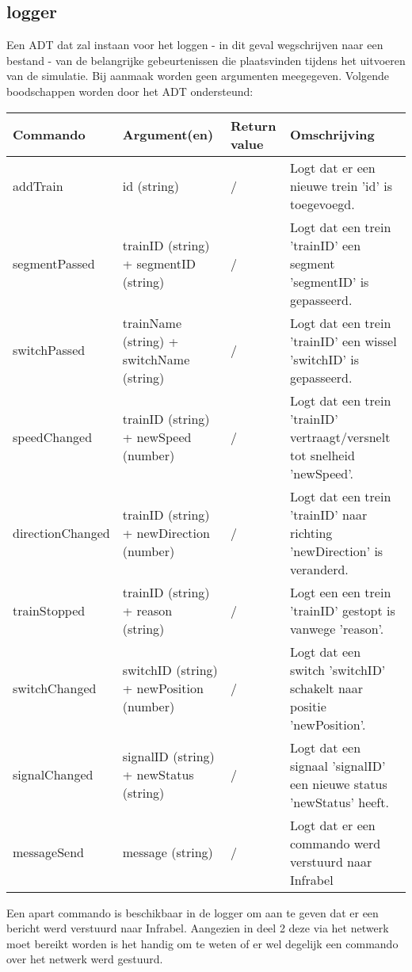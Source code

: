 \documentclass{article}
\begin{document}
\subsection{logger} %
Een ADT dat zal instaan voor het loggen - in dit geval wegschrijven naar een bestand - van de belangrijke gebeurtenissen die plaatsvinden tijdens het uitvoeren van de simulatie. Bij aanmaak worden geen argumenten meegegeven.
Volgende boodschappen worden door het ADT ondersteund:
\begin{center}
    \begin{tabular}{ | l | p{3.5cm} | l | p{8cm} |}
    \hline
    Commando & Argument(en) & Return value & Omschrijving \\ \hline
    addTrain & id (string) & / & Logt dat er een nieuwe trein 'id' is toegevoegd. \\ \hline
    segmentPassed & trainID (string) + segmentID (string) & / & Logt dat een trein 'trainID' een segment 'segmentID' is gepasseerd. \\ \hline
    switchPassed & trainName (string) + switchName (string) & / & Logt dat een trein 'trainID' een wissel 'switchID' is gepasseerd. \\ \hline
    speedChanged & trainID (string) + newSpeed (number) & / & Logt dat een trein 'trainID' vertraagt/versnelt tot snelheid 'newSpeed'. \\ \hline
    directionChanged & trainID (string) + newDirection (number) & / & Logt dat een trein 'trainID' naar richting 'newDirection' is veranderd. \\ \hline
    trainStopped & trainID (string) + reason (string) & / & Logt een een trein 'trainID' gestopt is vanwege 'reason'. \\ \hline
    switchChanged & switchID (string) + newPosition (number) & / & Logt dat een switch 'switchID' schakelt naar positie 'newPosition'. \\ \hline
    signalChanged & signalID (string) + newStatus (string) & / & Logt dat een signaal 'signalID' een nieuwe status 'newStatus' heeft. \\ \hline
    messageSend & message (string) & / & Logt dat er een commando werd verstuurd naar Infrabel \\ \hline
    \end{tabular}
\end{center}

Een apart commando is beschikbaar in de logger om aan te geven dat er een bericht werd verstuurd naar Infrabel. Aangezien in deel 2 deze via het netwerk moet bereikt worden is het handig om te weten of er wel degelijk een commando over het netwerk werd gestuurd.
\end{document}
